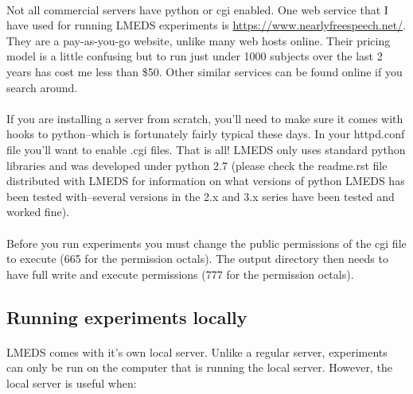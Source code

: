 \paragraph{}
Not all commercial servers have python or cgi enabled.  One web service that I have used for running LMEDS experiments is \url{https://www.nearlyfreespeech.net/}.  They are a pay-as-you-go website, unlike many web hosts online.  Their pricing model is a little confusing but to run just under 1000 subjects over the last 2 years has cost me less than \$50.  Other similar services can be found online if you search around.

\paragraph{}
If you are installing a server from scratch, you'll need to make sure it comes with hooks to python--which is fortunately fairly typical these days.  In your httpd.conf file you'll want to enable .cgi files.  That is all!  LMEDS only uses standard python libraries and was developed under python 2.7 (please check the readme.rst file distributed with LMEDS for information on what versions of python LMEDS has been tested with--several versions in the 2.x and 3.x series have been tested and worked fine).

\paragraph{}
\begin{tcolorbox}[breakable,colback=white,colframe=green,width=\dimexpr\textwidth+12mm\relax,enlarge left by=-6mm,enlarge right by=6mm]
Before you run experiments you must change the public permissions of the cgi file to execute (665 for the permission octals).  The output directory then needs to have full write and execute permissions (777 for the permission octals).
\end{tcolorbox}

\subsection{Running experiments locally} 

\paragraph{}
LMEDS comes with it's own local server.  Unlike a regular server, experiments can only be run on the computer that is running the local server.  However, the local server is useful when:

